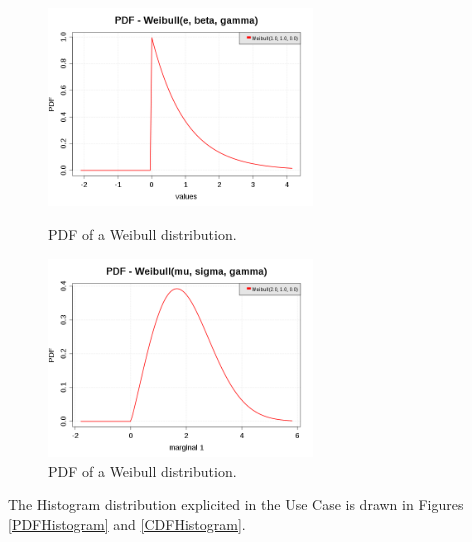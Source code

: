 \begin{figure}[H]
  \begin{minipage}{10cm}
    \begin{center}
      \includegraphics[width=7cm]{pdf_Weibull_1.png}
      \caption{PDF of a  Weibull distribution.}
      \label{PDFWeibull1}
    \end{center}
  \end{minipage}
  \hfill
  \begin{minipage}{10cm}
    \begin{center}
      \includegraphics[width=7cm]{pdf_Weibull_2.png}
      \caption{PDF of a Weibull distribution.}
      \label{PDFWeibull2}
    \end{center}
  \end{minipage}
\end{figure}





The Histogram distribution explicited in the Use Case is drawn in Figures \ref{PDFHistogram} and \ref{CDFHistogram}.


